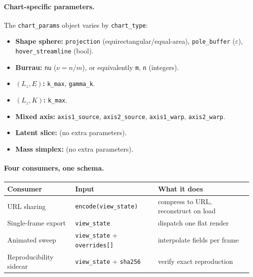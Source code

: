 \documentclass[11pt]{report}
\begin{document}
\paragraph{Chart-specific parameters.} The \texttt{chart\_params} object varies by \texttt{chart\_type}:
\begin{itemize}[nosep]
\item \textbf{Shape sphere:} \texttt{projection} (equirectangular/equal-area), \texttt{pole\_buffer} ($\varepsilon$), \texttt{hover\_streamline} (bool).
\item \textbf{Burrau:} \texttt{nu} ($\nu=n/m$), or equivalently \texttt{m}, \texttt{n} (integers).
\item \textbf{$(L_z,E)$:} \texttt{k\_max}, \texttt{gamma\_k}.
\item \textbf{$(L_z,K)$:} \texttt{k\_max}.
\item \textbf{Mixed axis:} \texttt{axis1\_source}, \texttt{axis2\_source}, \texttt{axis1\_warp}, \texttt{axis2\_warp}.
\item \textbf{Latent slice:} (no extra parameters).
\item \textbf{Mass simplex:} (no extra parameters).
\end{itemize}

\paragraph{Four consumers, one schema.}

\begin{center}
\begin{tabular}{lll}
\toprule
Consumer & Input & What it does \\
\midrule
URL sharing & \texttt{encode(view\_state)} & compress to URL, reconstruct on load \\
Single-frame export & \texttt{view\_state} & dispatch one flat render \\
Animated sweep & \texttt{view\_state} + \texttt{overrides[]} & interpolate fields per frame \\
Reproducibility sidecar & \texttt{view\_state} + \texttt{sha256} & verify exact reproduction \\
\bottomrule
\end{tabular}
\end{center}
\end{document}
